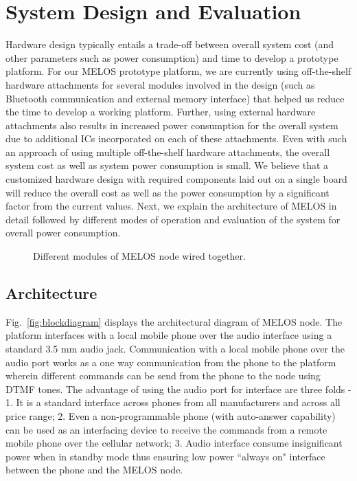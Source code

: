 \documentclass[10pt]{sigplan-proc-varsize}
\newcommand{\figref}[1]{Fig.~\ref{#1}}
\newcommand{\melos}{MELOS }
\begin{document}
\section{System Design and Evaluation}
\label{sec:sysDes}
Hardware design typically entails a trade-off between overall system cost (and other parameters such as power consumption) and time to develop a prototype platform. For our \melos prototype platform, we are currently using off-the-shelf hardware attachments for several modules involved in the design (such as Bluetooth communication and external memory interface) that helped us reduce the time to develop a working platform. Further, using external hardware attachments also results in increased power consumption for the overall system due to additional ICs incorporated on each of these attachments. Even with such an approach of using multiple off-the-shelf hardware attachments, the overall system cost as well as system power consumption is small. We believe that a customized hardware design with required components laid out on a single board will reduce the overall cost as well as the power consumption by a significant factor from the current values. Next, we explain the architecture of \melos in detail followed by different modes of operation and evaluation of the system for overall power consumption.

\begin{figure}
\centering
{}
\caption{Different modules of \melos node wired together.}
\label{fig:meloscircuit}
\end{figure}

\subsection{Architecture}
\figref{fig:blockdiagram} displays the architectural diagram of \melos node. The platform interfaces with a local mobile phone over the audio interface using a standard 3.5 mm audio jack. Communication with a local mobile phone over the audio port works as a one way communication from the phone to the platform wherein different commands can be send from the phone to the node using DTMF tones. The advantage of using the audio port for interface are three folds - 1. It is a standard interface across phones from all manufacturers and across all price range; 2. Even a non-programmable phone (with auto-answer capability) can be used as an interfacing device to receive the commands from a remote mobile phone over the cellular network; 3. Audio interface consume insignificant power when in standby mode thus ensuring low power ``always on" interface between the phone and the \melos node. 
\end{document}
